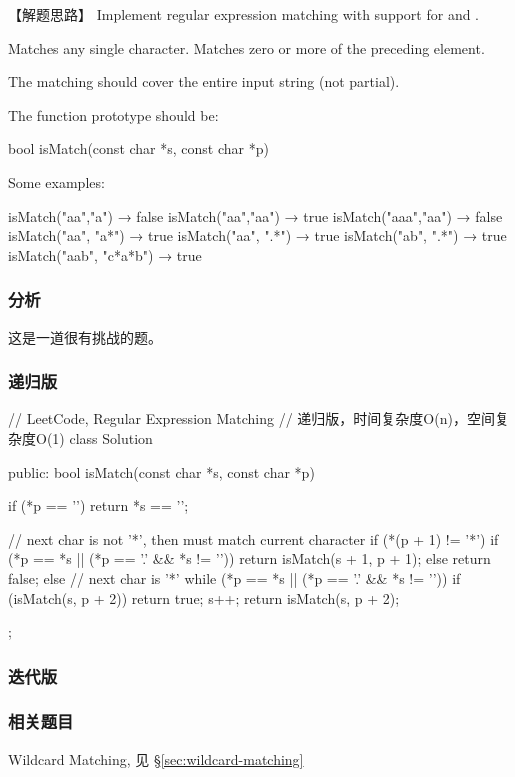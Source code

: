 【解题思路】
Implement regular expression matching with support for  and .

 Matches any single character.
 Matches zero or more of the preceding element.

The matching should cover the entire input string (not partial).

The function prototype should be:
\begin{Code}
	bool isMatch(const char *s, const char *p)
\end{Code}

Some examples:
\begin{Code}
	isMatch("aa","a") → false
	isMatch("aa","aa") → true
	isMatch("aaa","aa") → false
	isMatch("aa", "a*") → true
	isMatch("aa", ".*") → true
	isMatch("ab", ".*") → true
	isMatch("aab", "c*a*b") → true
\end{Code}


\subsubsection{分析}
这是一道很有挑战的题。


\subsubsection{递归版}
\begin{Code}
	// LeetCode, Regular Expression Matching
	// 递归版，时间复杂度O(n)，空间复杂度O(1)
	class Solution {
		public:
		bool isMatch(const char *s, const char *p) {
			if (*p == '\0') return *s == '\0';
			
			// next char is not '*', then must match current character
			if (*(p + 1) != '*') {
				if (*p == *s || (*p == '.' && *s != '\0'))
				return isMatch(s + 1, p + 1);
				else
				return false;
			} else { // next char is '*'
			while (*p == *s || (*p == '.' && *s != '\0')) {
				if (isMatch(s, p + 2))
				return true;
				s++;
			}
			return isMatch(s, p + 2);
		}
	}
};
\end{Code}


\subsubsection{迭代版}
\begin{Code}
	
\end{Code}


\subsubsection{相关题目}
\begindot
\item Wildcard Matching, 见 \S \ref{sec:wildcard-matching}
\myenddot


